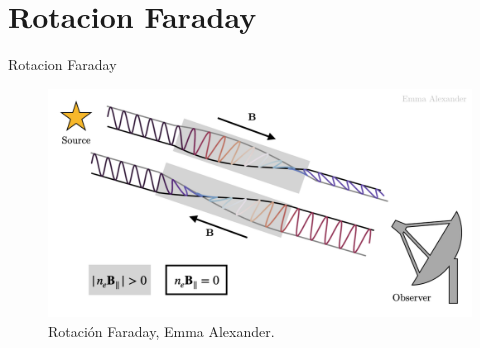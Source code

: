 \documentclass[xetex,aspectratio=169]{beamer}
\begin{document}
	\section{Rotacion Faraday}
	\begin{frame}{Rotacion Faraday}
		\begin{figure}
			\centering
			\includegraphics[width=.8\textwidth, keepaspectratio]{figures/faraday_rotation/faraday_rot.png}
			\caption*{Rotación Faraday, Emma Alexander.}
		\end{figure}
	\end{frame}
\end{document}
